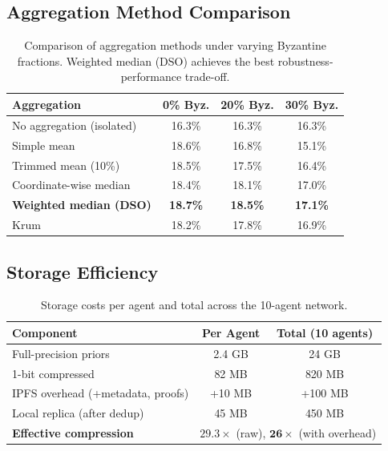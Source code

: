 \documentclass[11pt]{article}
\begin{document}
\subsection{Aggregation Method Comparison}

\begin{table}[h]
\centering
\begin{tabular}{lccc}
\toprule
Aggregation & 0\% Byz. & 20\% Byz. & 30\% Byz. \\
\midrule
No aggregation (isolated) & 16.3\% & 16.3\% & 16.3\% \\
Simple mean & 18.6\% & 16.8\% & 15.1\% \\
Trimmed mean (10\%) & 18.5\% & 17.5\% & 16.4\% \\
Coordinate-wise median & 18.4\% & 18.1\% & 17.0\% \\
\textbf{Weighted median (DSO)} & \textbf{18.7\%} & \textbf{18.5\%} & \textbf{17.1\%} \\
Krum~\cite{blanchard2017machine} & 18.2\% & 17.8\% & 16.9\% \\
\bottomrule
\end{tabular}
\caption{Comparison of aggregation methods under varying Byzantine fractions.
Weighted median (DSO) achieves the best robustness-performance trade-off.}
\label{tab:aggregation-comparison}
\end{table}

\subsection{Storage Efficiency}

\begin{table}[h]
\centering
\begin{tabular}{lcc}
\toprule
Component & Per Agent & Total (10 agents) \\
\midrule
Full-precision priors & 2.4 GB & 24 GB \\
1-bit compressed & 82 MB & 820 MB \\
IPFS overhead (+metadata, proofs) & +10 MB & +100 MB \\
Local replica (after dedup) & 45 MB & 450 MB \\
\midrule
\textbf{Effective compression} & \multicolumn{2}{c}{$\mathbf{29.3\times}$ (raw), $\mathbf{26\times}$ (with overhead)} \\
\bottomrule
\end{tabular}
\caption{Storage costs per agent and total across the 10-agent network.}
\label{tab:storage}
\end{table}
\end{document}
